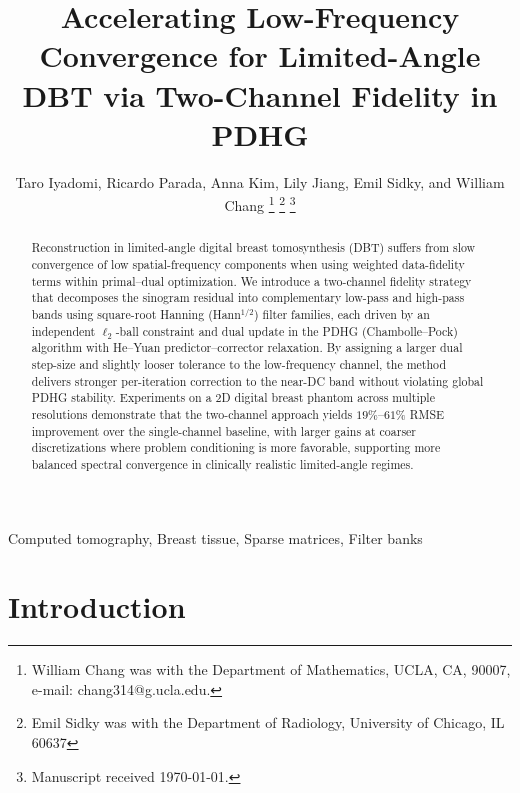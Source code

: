 \documentclass[journal, a4paper]{IEEEtran}
\begin{document}
\title{Accelerating Low-Frequency Convergence for Limited-Angle DBT via Two-Channel Fidelity in PDHG}					%

\author{Taro Iyadomi,
        Ricardo Parada, Anna Kim, Lily Jiang, Emil Sidky, and William Chang %
\thanks{William Chang was with the Department of Mathematics, UCLA, CA, 90007, e-mail: chang314@g.ucla.edu.}%
\thanks{Emil Sidky was with the Department of Radiology, University of Chicago, IL 60637}%
\thanks{Manuscript received \today.}}


\maketitle

\begin{abstract}
Reconstruction in limited-angle digital breast tomosynthesis (DBT) suffers from slow convergence of low spatial-frequency components when using weighted data-fidelity terms within primal–dual optimization. We introduce a two-channel fidelity strategy that decomposes the sinogram residual into complementary low-pass and high-pass bands using square-root Hanning (Hann$^{1/2}$) filter families, each driven by an independent $\ell_2$-ball constraint and dual update in the PDHG (Chambolle–Pock) algorithm with He–Yuan predictor–corrector relaxation. By assigning a larger dual step-size and slightly looser tolerance to the low-frequency channel, the method delivers stronger per-iteration correction to the near-DC band without violating global PDHG stability. Experiments on a 2D digital breast phantom across multiple resolutions demonstrate that the two-channel approach yields $19\%$--$61\%$ RMSE improvement over the single-channel baseline, with larger gains at coarser discretizations where problem conditioning is more favorable, supporting more balanced spectral convergence in clinically realistic limited-angle regimes.
\end{abstract}


\begin{IEEEkeywords}
Computed tomography, Breast tissue, Sparse matrices, Filter banks
\end{IEEEkeywords}


\section{Introduction}
\end{document}
